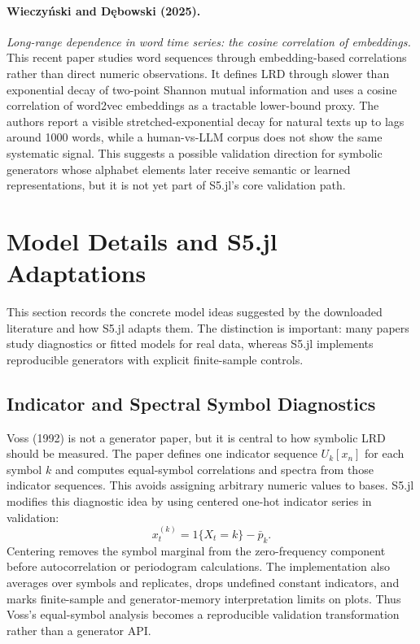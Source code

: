 \documentclass[11pt]{article}
\begin{document}
\paragraph{Wieczyński and Dębowski (2025).}
\emph{Long-range dependence in word time series: the cosine correlation of
embeddings.}
This recent paper studies word sequences through embedding-based correlations
rather than direct numeric observations. It defines LRD through slower than
exponential decay of two-point Shannon mutual information and uses a cosine
correlation of word2vec embeddings as a tractable lower-bound proxy. The
authors report a visible stretched-exponential decay for natural texts up to
lags around 1000 words, while a human-vs-LLM corpus does not show the same
systematic signal. This suggests a possible validation direction for symbolic
generators whose alphabet elements later receive semantic or learned
representations, but it is not yet part of S5.jl's core validation path.

\section{Model Details and S5.jl Adaptations}

This section records the concrete model ideas suggested by the downloaded
literature and how S5.jl adapts them. The distinction is important: many papers
study diagnostics or fitted models for real data, whereas S5.jl implements
reproducible generators with explicit finite-sample controls.

\subsection{Indicator and Spectral Symbol Diagnostics}

Voss (1992) is not a generator paper, but it is central to how symbolic LRD
should be measured. The paper defines one indicator sequence $U_k[x_n]$ for
each symbol $k$ and computes equal-symbol correlations and spectra from those
indicator sequences. This avoids assigning arbitrary numeric values to bases.
S5.jl modifies this diagnostic idea by using centered one-hot indicator series
in validation:
\[
  x_t^{(k)} = 1\{X_t = k\} - \bar{p}_k .
\]
Centering removes the symbol marginal from the zero-frequency component before
autocorrelation or periodogram calculations. The implementation also averages
over symbols and replicates, drops undefined constant indicators, and marks
finite-sample and generator-memory interpretation limits on plots. Thus Voss's
equal-symbol analysis becomes a reproducible validation transformation rather
than a generator API.
\end{document}
